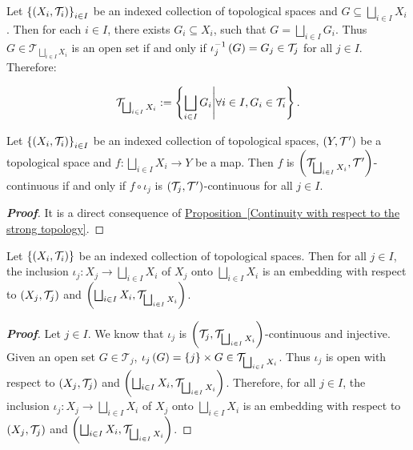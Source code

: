 \begin{remark}
  Let $\left\{\left(X_i,\mathcal{T}_i\right)\right\}_{i\in I}$ be an indexed collection of topological spaces and $G\subseteq\bigsqcup_{i\in I}{X_i}$. Then for each $i\in I$, there exists $G_i\subseteq X_i$, such that $G=\bigsqcup_{i\in I}{G_i}$. Thus $G\in\mathcal{T}_{\bigsqcup_{i\in I}{X_i}}$ is an open set if and only if $\iota_j^{-1}\left(G\right)=G_j\in\mathcal{T}_j$ for all $j\in I$. Therefore:

  \begin{equation}
    \mathcal{T}_{\bigsqcup_{i\in I}{X_i}}:=\left\{\bigsqcup_{i\in I}{G_i}\middle|\forall i\in I,G_i\in\mathcal{T}_i\right\}.
  \end{equation}
\end{remark}

\begin{corollary}\label{Continuity with respect to the sum topology}
  Let $\left\{\left(X_i,\mathcal{T}_i\right)\right\}_{i\in I}$ be an indexed collection of topological spaces, $\left(Y,\mathcal{T}'\right)$ be a topological space and $f:\bigsqcup_{i\in I}{X_i}\rightarrow Y$ be a map. Then $f$ is $\left(\mathcal{T}_{\bigsqcup_{i\in I}{X_i}},\mathcal{T}'\right)$-continuous if and only if $f\circ\iota_j$ is $\left(\mathcal{T}_j,\mathcal{T}'\right)$-continuous for all $j\in I$.

  \begin{proof}[\rm\textbf{Proof}]
    It is a direct consequence of \hyperref[Continuity with respect to the strong topology]{Proposition~\ref*{Continuity with respect to the strong topology}}.
  \end{proof}
\end{corollary}

\begin{proposition}
  \rm Let $\left\{\left(X_i,\mathcal{T}_i\right)\right\}$ be an indexed collection of topological spaces. Then for all $j\in I$, the inclusion $\iota_j:X_j\rightarrow\bigsqcup_{i\in I}{X_i}$ of $X_j$ onto $\bigsqcup_{i\in I}{X_i}$ is an embedding with respect to $\left(X_j,\mathcal{T}_j\right)$ and $\left(\bigsqcup_{i\in I}{X_i},\mathcal{T}_{\bigsqcup_{i\in I}{X_i}}\right)$.
  
  \begin{proof}[\rm\textbf{Proof}]
    Let $j\in I$. We know that $\iota_j$ is $\left(\mathcal{T}_j,\mathcal{T}_{\bigsqcup_{i\in I}{X_i}}\right)$-continuous and injective. Given an open set $G\in\mathcal{T}_j$, $\iota_j\left(G\right)=\left\{j\right\}\times G\in\mathcal{T}_{\bigsqcup_{i\in I}{X_i}}$. Thus $\iota_j$ is open with respect to $\left(X_j,\mathcal{T}_j\right)$ and $\left(\bigsqcup_{i\in I}{X_i},\mathcal{T}_{\bigsqcup_{i\in I}{X_i}}\right)$. Therefore, for all $j\in I$, the inclusion $\iota_j:X_j\rightarrow\bigsqcup_{i\in I}{X_i}$ of $X_j$ onto $\bigsqcup_{i\in I}{X_i}$ is an embedding with respect to $\left(X_j,\mathcal{T}_j\right)$ and $\left(\bigsqcup_{i\in I}{X_i},\mathcal{T}_{\bigsqcup_{i\in I}{X_i}}\right)$.
  \end{proof}
\end{proposition}

